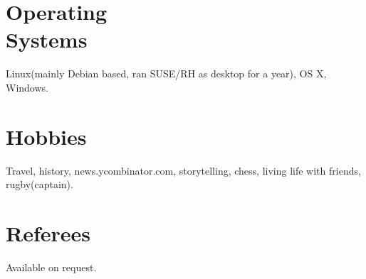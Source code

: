 \documentclass[margin,line]{resume}
\begin{document}
\begin{resume}
    \section{\mysidestyle Operating \\Systems}
    Linux(mainly Debian based, ran SUSE/RH as desktop for a year), OS X, Windows.

    \section{\mysidestyle Hobbies}
    Travel, history, news.ycombinator.com, storytelling, chess, living life with friends, rugby(captain).

    \section{\mysidestyle Referees} 
    Available on request.

\end{resume}
\end{document}
